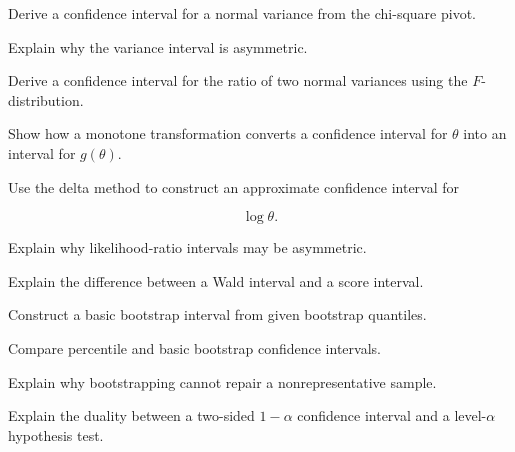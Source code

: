 \begin{exercise}[3]
Derive a confidence interval for a normal variance from the chi-square
pivot.
\end{exercise}

\begin{exercise}[3]
Explain why the variance interval is asymmetric.
\end{exercise}

\begin{exercise}[3]
Derive a confidence interval for the ratio of two normal variances using
the \(F\)-distribution.
\end{exercise}

\begin{exercise}[3]
Show how a monotone transformation converts a confidence interval for
\(\theta\) into an interval for \(g(\theta)\).
\end{exercise}

\begin{exercise}[3]
Use the delta method to construct an approximate confidence interval for

\[
\log\theta.
\]
\end{exercise}

\begin{exercise}[3]
Explain why likelihood-ratio intervals may be asymmetric.
\end{exercise}

\begin{exercise}[3]
Explain the difference between a Wald interval and a score interval.
\end{exercise}

\begin{exercise}[3]
Construct a basic bootstrap interval from given bootstrap quantiles.
\end{exercise}

\begin{exercise}[3]
Compare percentile and basic bootstrap confidence intervals.
\end{exercise}

\begin{exercise}[3]
Explain why bootstrapping cannot repair a nonrepresentative sample.
\end{exercise}

\begin{exercise}[3]
Explain the duality between a two-sided \(1-\alpha\) confidence interval
and a level-\(\alpha\) hypothesis test.
\end{exercise}

